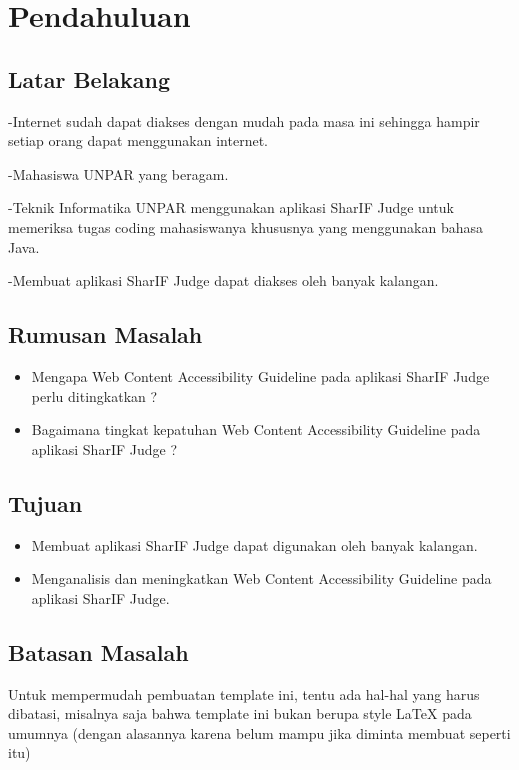 \chapter{Pendahuluan}
\label{chap:intro}
   
\section{Latar Belakang}
\label{sec:label}

-Internet sudah dapat diakses dengan mudah pada masa ini sehingga hampir setiap orang dapat menggunakan internet.

-Mahasiswa UNPAR yang beragam.

-Teknik Informatika UNPAR menggunakan aplikasi SharIF Judge untuk memeriksa tugas coding mahasiswanya khususnya yang menggunakan bahasa Java.

-Membuat aplikasi SharIF Judge dapat diakses oleh banyak kalangan.



\section{Rumusan Masalah}
\label{sec:rumusan}
\begin{itemize}
	\item Mengapa Web Content Accessibility Guideline pada aplikasi SharIF Judge perlu ditingkatkan ?
	\item Bagaimana tingkat kepatuhan Web Content Accessibility Guideline pada aplikasi SharIF Judge ?
\end{itemize}

\section{Tujuan}
\label{sec:tujuan}
\begin{itemize}
	\item Membuat aplikasi SharIF Judge dapat digunakan oleh banyak kalangan.
	\item Menganalisis dan meningkatkan Web Content Accessibility Guideline pada aplikasi SharIF Judge.
\end{itemize} 

\section{Batasan Masalah}
\label{sec:batasan}
Untuk mempermudah pembuatan template ini, tentu ada hal-hal yang harus dibatasi, misalnya saja bahwa template ini bukan berupa style \LaTeX{} pada umumnya (dengan alasannya karena belum mampu jika diminta membuat seperti itu)

